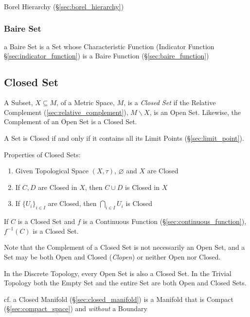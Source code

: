 \fist Borel Hierarchy (\S\ref{sec:borel_hierarchy})



\subsubsection{Baire Set}\label{sec:baire_set}

a Baire Set is a Set whose Characteristic Function (Indicator Function
\S\ref{sec:indicator_function}) is a Baire Function (\S\ref{sec:baire_function})



\subsection{Closed Set}\label{sec:closed_set}

A Subset, $X \subseteq M$, of a Metric Space, $M$, is a \emph{Closed
  Set} if the Relative Complement (\ref{sec:relative_complement}), $M
\backslash X$, is an Open Set. Likewise, the Complement of an Open Set
is a Closed Set.

A Set is Closed if and only if it contains all its Limit Points
(\S\ref{sec:limit_point}).

Properties of Closed Sets:
\begin{enumerate}
  \item Given Topological Space $(X, \tau)$, $\varnothing$ and $X$ are
    Closed
  \item If $C, D$ are Closed in $X$, then $C \cup D$ is Closed in $X$
  \item If $\{ U_i \}_{i \in I}$ are Closed, then $\bigcap_{i \in I}
  U_i$ is Closed
\end{enumerate}

If $C$ is a Closed Set and $f$ is a Continuous Function
(\S\ref{sec:continuous_function}), $f^{-1}(C)$ is a Closed Set.

\fist Note that the Complement of a Closed Set is not
necessarily an Open Set, and a Set may be both Open and Closed
(\emph{Clopen}) or neither Open nor Closed.

In the Discrete Topology, every Open Set is also a Closed Set. In the
Trivial Topology both the Empty Set and the entire Set are both Open
and Closed Sets.

\fist cf. a Closed Manifold (\S\ref{sec:closed_manifold}) is a Manifold that is
Compact (\S\ref{sec:compact_space}) and \emph{without} a Boundary

